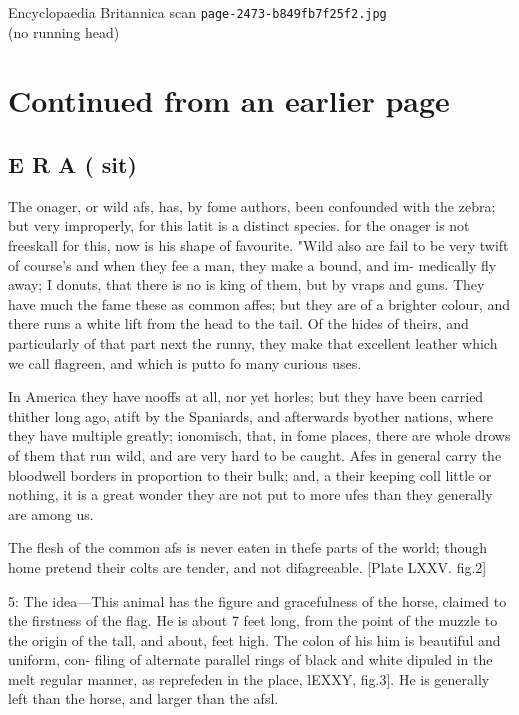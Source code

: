 \documentclass{article}
\begin{document}
\begin{center}
{\Large Encyclopaedia Britannica scan \texttt{page-2473-b849fb7f25f2.jpg}}\\[0.5em]
(no running head)
\end{center}
\section*{Continued from an earlier page}
\subsection*{E R A ( sit)}
The onager, or wild afs, has, by fome authors,  been confounded with the zebra; but very improperly, for this latit is a distinct species. for the onager is not freeskall for this, now is his shape of favourite. "Wild also are fail to be very twift of course’s and when they fee a man, they make a bound, and im- medically fly away; I donuts, that there is no is king of them, but by vraps and guns. They have much the fame these as common affes; but they are of a brighter colour, and there runs a white lift from the head to the tail. Of the hides of theirs, and particularly of that part next the runny, they make that excellent leather which we call flagreen, and which is putto fo many curious uses.

In America they have nooffs at all, nor yet horles; but they have been carried thither long ago, atift by the Spaniards, and afterwards byother nations, where they have multiple greatly; ionomisch, that, in fome places, there are whole drows of them that run wild, and are very hard to be caught. Afes in general carry the bloodwell borders in proportion to their bulk; and, a their keeping coll little or nothing, it is a great wonder they are not put to more ufes than they generally are among us.

The flesh of the common afs is never eaten in thefe parts of the world; though home pretend their colts are tender, and not difagreeable. [Plate LXXV. fig.2]

5: The idea—This animal has the figure and gracefulness of the horse, claimed to the firstness of the flag. He is about 7 feet long, from the point of the muzzle to the origin of the tall, and about, feet high. The colon of his him is beautiful and uniform, con- filing of alternate parallel rings of black and white dipuled in the melt regular manner, as reprefeden in the place, lEXXY, fig.3]. He is generally left than the horse, and larger than the afsl.
\end{document}
